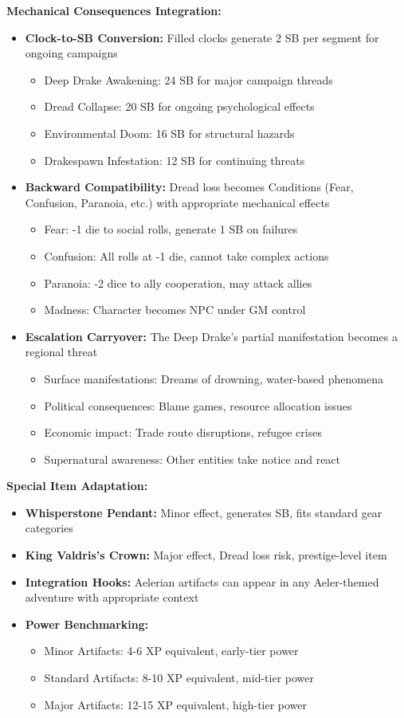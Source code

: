 \documentclass[11pt]{article}
\begin{document}
\textbf{Mechanical Consequences Integration:}
\begin{itemize}
\item \textbf{Clock-to-SB Conversion:} Filled clocks generate 2 SB per segment for ongoing campaigns
  \begin{itemize}
  \item Deep Drake Awakening: 24 SB for major campaign threads
  \item Dread Collapse: 20 SB for ongoing psychological effects
  \item Environmental Doom: 16 SB for structural hazards
  \item Drakespawn Infestation: 12 SB for continuing threats
  \end{itemize}
\item \textbf{Backward Compatibility:} Dread loss becomes Conditions (Fear, Confusion, Paranoia, etc.) with appropriate mechanical effects
  \begin{itemize}
  \item Fear: -1 die to social rolls, generate 1 SB on failures
  \item Confusion: All rolls at -1 die, cannot take complex actions
  \item Paranoia: -2 dice to ally cooperation, may attack allies
  \item Madness: Character becomes NPC under GM control
  \end{itemize}
\item \textbf{Escalation Carryover:} The Deep Drake's partial manifestation becomes a regional threat
  \begin{itemize}
  \item Surface manifestations: Dreams of drowning, water-based phenomena
  \item Political consequences: Blame games, resource allocation issues
  \item Economic impact: Trade route disruptions, refugee crises
  \item Supernatural awareness: Other entities take notice and react
  \end{itemize}
\end{itemize}

\textbf{Special Item Adaptation:}
\begin{itemize}
\item \textbf{Whisperstone Pendant:} Minor effect, generates SB, fits standard gear categories
\item \textbf{King Valdris's Crown:} Major effect, Dread loss risk, prestige-level item
\item \textbf{Integration Hooks:} Aelerian artifacts can appear in any Aeler-themed adventure with appropriate context
\item \textbf{Power Benchmarking:}
  \begin{itemize}
  \item Minor Artifacts: 4-6 XP equivalent, early-tier power
  \item Standard Artifacts: 8-10 XP equivalent, mid-tier power
  \item Major Artifacts: 12-15 XP equivalent, high-tier power
  \end{itemize}
\end{itemize}
\end{document}
